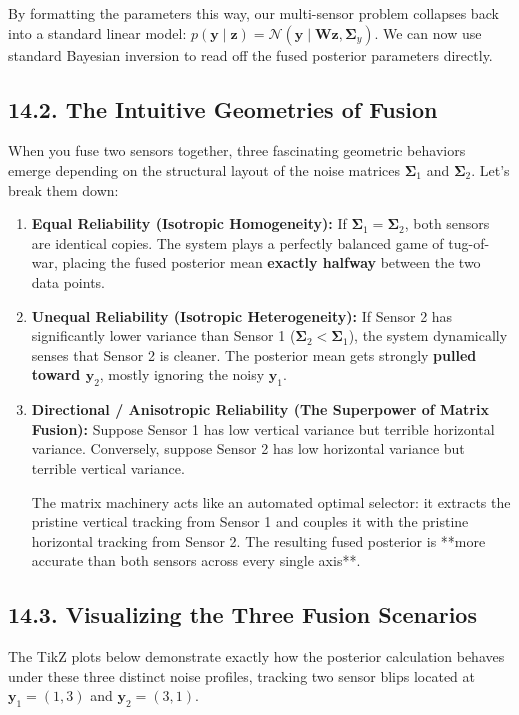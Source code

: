 \documentclass{article}
\begin{document}
By formatting the parameters this way, our multi-sensor problem collapses back into a standard linear model: $p(\mathbf{y} \mid \mathbf{z}) = \mathcal{N}(\mathbf{y} \mid \mathbf{W}\mathbf{z}, \boldsymbol{\Sigma}_y)$. We can now use standard Bayesian inversion to read off the fused posterior parameters directly.

\subsection*{14.2. The Intuitive Geometries of Fusion}
When you fuse two sensors together, three fascinating geometric behaviors emerge depending on the structural layout of the noise matrices $\boldsymbol{\Sigma}_1$ and $\boldsymbol{\Sigma}_2$. Let's break them down:

\begin{enumerate}
    \item \textbf{Equal Reliability (Isotropic Homogeneity):} If $\boldsymbol{\Sigma}_1 = \boldsymbol{\Sigma}_2$, both sensors are identical copies. The system plays a perfectly balanced game of tug-of-war, placing the fused posterior mean \textbf{exactly halfway} between the two data points.
    \item \textbf{Unequal Reliability (Isotropic Heterogeneity):} If Sensor 2 has significantly lower variance than Sensor 1 ($\boldsymbol{\Sigma}_2 < \boldsymbol{\Sigma}_1$), the system dynamically senses that Sensor 2 is cleaner. The posterior mean gets strongly \textbf{pulled toward $\mathbf{y}_2$}, mostly ignoring the noisy $\mathbf{y}_1$.
    \item \textbf{Directional / Anisotropic Reliability (The Superpower of Matrix Fusion):} Suppose Sensor 1 has low vertical variance but terrible horizontal variance. Conversely, suppose Sensor 2 has low horizontal variance but terrible vertical variance. 
    
    The matrix machinery acts like an automated optimal selector: it extracts the pristine vertical tracking from Sensor 1 and couples it with the pristine horizontal tracking from Sensor 2. The resulting fused posterior is **more accurate than both sensors across every single axis**.
\end{enumerate}

\subsection*{14.3. Visualizing the Three Fusion Scenarios}
The TikZ plots below demonstrate exactly how the posterior calculation behaves under these three distinct noise profiles, tracking two sensor blips located at $\mathbf{y}_1 = (1,3)$ and $\mathbf{y}_2 = (3,1)$.
\end{document}
